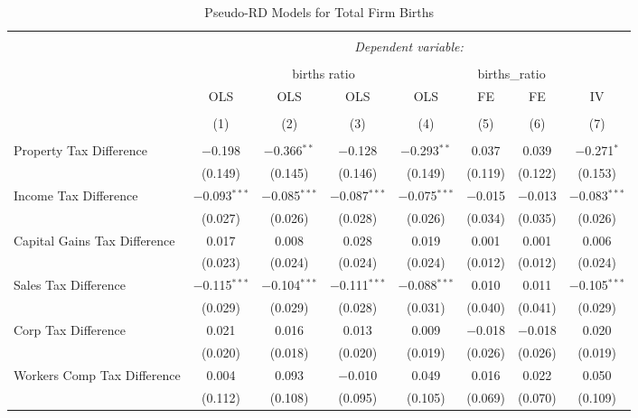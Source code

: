 
\begin{table}[!htbp] \centering 
  \caption{Pseudo-RD Models for  Total Firm Births} 
  \label{} 
\begin{tabular}{@{\extracolsep{5pt}}lccccccc} 
\\[-1.8ex]\hline 
\hline \\[-1.8ex] 
 & \multicolumn{7}{c}{\textit{Dependent variable:}} \\ 
\cline{2-8} 
\\[-1.8ex] & \multicolumn{4}{c}{births ratio} & \multicolumn{2}{c}{births\_ratio} &   \\ 
 & OLS & OLS & OLS & OLS & FE & FE & IV \\ 
\\[-1.8ex] & (1) & (2) & (3) & (4) & (5) & (6) & (7)\\ 
\hline \\[-1.8ex] 
 Property Tax Difference & $-$0.198 & $-$0.366$^{**}$ & $-$0.128 & $-$0.293$^{**}$ & 0.037 & 0.039 & $-$0.271$^{*}$ \\ 
  & (0.149) & (0.145) & (0.146) & (0.149) & (0.119) & (0.122) & (0.153) \\ 
  Income Tax Difference & $-$0.093$^{***}$ & $-$0.085$^{***}$ & $-$0.087$^{***}$ & $-$0.075$^{***}$ & $-$0.015 & $-$0.013 & $-$0.083$^{***}$ \\ 
  & (0.027) & (0.026) & (0.028) & (0.026) & (0.034) & (0.035) & (0.026) \\ 
  Capital Gains Tax Difference & 0.017 & 0.008 & 0.028 & 0.019 & 0.001 & 0.001 & 0.006 \\ 
  & (0.023) & (0.024) & (0.024) & (0.024) & (0.012) & (0.012) & (0.024) \\ 
  Sales Tax Difference & $-$0.115$^{***}$ & $-$0.104$^{***}$ & $-$0.111$^{***}$ & $-$0.088$^{***}$ & 0.010 & 0.011 & $-$0.105$^{***}$ \\ 
  & (0.029) & (0.029) & (0.028) & (0.031) & (0.040) & (0.041) & (0.029) \\ 
  Corp Tax Difference & 0.021 & 0.016 & 0.013 & 0.009 & $-$0.018 & $-$0.018 & 0.020 \\ 
  & (0.020) & (0.018) & (0.020) & (0.019) & (0.026) & (0.026) & (0.019) \\ 
  Workers Comp Tax Difference & 0.004 & 0.093 & $-$0.010 & 0.049 & 0.016 & 0.022 & 0.050 \\ 
  & (0.112) & (0.108) & (0.095) & (0.105) & (0.069) & (0.070) & (0.109) \\ 

\end{tabular}
\end{table}
